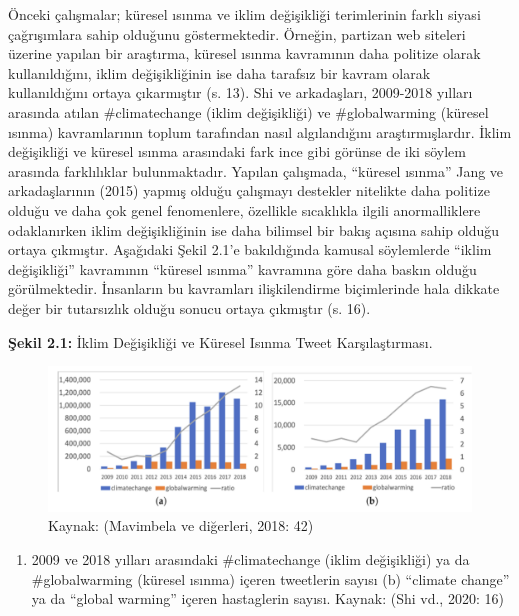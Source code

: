 \documentclass[
]{book}
\providecommand{\tightlist}{%
  \setlength{\itemsep}{0pt}\setlength{\parskip}{0pt}}
\begin{document}
Önceki çalışmalar; küresel ısınma ve iklim değişikliği terimlerinin farklı siyasi çağrışımlara sahip olduğunu göstermektedir. Örneğin, partizan web siteleri üzerine yapılan bir araştırma, küresel ısınma kavramının daha politize olarak kullanıldığını, iklim değişikliğinin ise daha tarafsız bir kavram olarak kullanıldığını ortaya çıkarmıştır (s. 13). \citep{jang2015polarized} Shi ve arkadaşları, 2009-2018 yılları arasında atılan \#climatechange (iklim değişikliği) ve \#globalwarming (küresel ısınma) kavramlarının toplum tarafından nasıl algılandığını araştırmışlardır. İklim değişikliği ve küresel ısınma arasındaki fark ince gibi görünse de iki söylem arasında farklılıklar bulunmaktadır. Yapılan çalışmada, ``küresel ısınma'' Jang ve arkadaşlarının (2015) yapmış olduğu çalışmayı destekler nitelikte daha politize olduğu ve daha çok genel fenomenlere, özellikle sıcaklıkla ilgili anormalliklere odaklanırken iklim değişikliğinin ise daha bilimsel bir bakış açısına sahip olduğu ortaya çıkmıştır. Aşağıdaki Şekil 2.1'e bakıldığında kamusal söylemlerde ``iklim değişikliği'' kavramının ``küresel ısınma'' kavramına göre daha baskın olduğu görülmektedir. İnsanların bu kavramları ilişkilendirme biçimlerinde hala dikkate değer bir tutarsızlık olduğu sonucu ortaya çıkmıştır (s. 16). \citep{shi2020climatechange}

\textbf{Şekil 2.1:} İklim Değişikliği ve Küresel Isınma Tweet Karşılaştırması.

\begin{figure}
\includegraphics[width=0.95\linewidth,height=0.95\textheight]{tablolar-sekiller/seki-2-1} \caption{Kaynak: (Mavimbela ve diğerleri, 2018: 42)}\label{fig:unnamed-chunk-1}
\end{figure}

\begin{enumerate}
\def\labelenumi{(\alph{enumi})}
\tightlist
\item
  2009 ve 2018 yılları arasındaki \#climatechange (iklim değişikliği) ya da \#globalwarming (küresel ısınma) içeren tweetlerin sayısı (b) ``climate change'' ya da ``global warming'' içeren hastaglerin sayısı.
  Kaynak: (Shi vd., 2020: 16) \citep{shi2020climatechange}
\end{enumerate}
\end{document}

